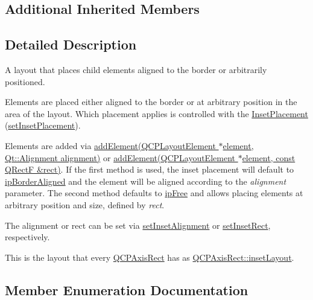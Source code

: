\subsection*{Additional Inherited Members}


\subsection{Detailed Description}
A layout that places child elements aligned to the border or arbitrarily positioned. 

Elements are placed either aligned to the border or at arbitrary position in the area of the layout. Which placement applies is controlled with the \hyperlink{classQCPLayoutInset_a8b9e17d9a2768293d2a7d72f5e298192}{Inset\+Placement} (\hyperlink{classQCPLayoutInset_a63298830744d5d8c5345511c00fd2144}{set\+Inset\+Placement}).

Elements are added via \hyperlink{classQCPLayoutInset_ad61529eb576af7f04dff94abb10c745a}{add\+Element(\+Q\+C\+P\+Layout\+Element $\ast$element, Qt\+::\+Alignment alignment)} or \hyperlink{classQCPLayoutInset_a8ff61fbee4a1f0ff45c398009d9f1e56}{add\+Element(\+Q\+C\+P\+Layout\+Element $\ast$element, const Q\+Rect\+F \&rect)}. If the first method is used, the inset placement will default to \hyperlink{classQCPLayoutInset_a8b9e17d9a2768293d2a7d72f5e298192aa81e7df4a785ddee2229a8f47c46e817}{ip\+Border\+Aligned} and the element will be aligned according to the {\itshape alignment} parameter. The second method defaults to \hyperlink{classQCPLayoutInset_a8b9e17d9a2768293d2a7d72f5e298192aa4802986ea2cea457f932b115acba59e}{ip\+Free} and allows placing elements at arbitrary position and size, defined by {\itshape rect}.

The alignment or rect can be set via \hyperlink{classQCPLayoutInset_a62882a4f9ad58bb0f53da12fde022abe}{set\+Inset\+Alignment} or \hyperlink{classQCPLayoutInset_aa487c8378a6f9533567a2e6430099dc3}{set\+Inset\+Rect}, respectively.

This is the layout that every \hyperlink{classQCPAxisRect}{Q\+C\+P\+Axis\+Rect} has as \hyperlink{classQCPAxisRect_a4114887c7141b59650b7488f930993e5}{Q\+C\+P\+Axis\+Rect\+::inset\+Layout}. 

\subsection{Member Enumeration Documentation}
\hypertarget{classQCPLayoutInset_a8b9e17d9a2768293d2a7d72f5e298192}{}

